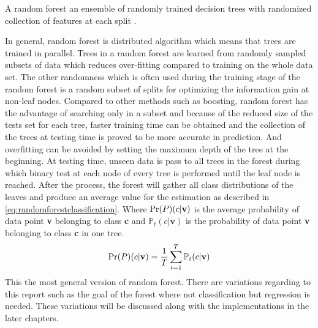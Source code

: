 \begin{definition}
\label{def:Random forest}
	A random forest an ensemble of randomly trained decision trees with randomized collection of features at each split \cite{DFMS}.
\end{definition}
In general, random forest is distributed algorithm which means that trees are trained in parallel. Trees in a random forest are learned from randomly sampled subsets of data which reduces over-fitting compared to training on the whole data set. \cite{GFRF, MVDT,RFML} The other randomness which is often used during the training stage of the random forest is a random subset of splits for optimizing the information gain at non-leaf nodes\cite{GFRF}. Compared to other methods such as boosting, random forest has the advantage of searching only in a subset and because of the reduced size of the tests set for each tree, faster training time can be obtained and the collection of the trees at testing time is proved to be more accurate in prediction.  And overfitting can be avoided by setting the maximum depth of the tree at the beginning. At testing time, unseen data is pass to all trees in the forest during which binary test at each node of every tree is performed until the leaf node is reached. After the process, the forest will gather all class distributions of the leaves and produce an average value for the estimation as described in \eqref{eq:randomforestclassification}. Where $ \Pr(P)(c|\mathbf{v})$ is the average probability of data point \textbf{v} belonging to class \textbf{c} and $\mathbb{P}_{t}(c|\mathbf{v})$ is the probability of data point \textbf{v} belonging to class \textbf{c} in one tree.
\begin{equation}
\label{eq:randomforestclassification}
	\Pr(P)(c|\mathbf{v}) = \frac{1}{T}\sum\limits_{t=1}^T \mathbb{P}_{t}(c|\mathbf{v})
\end{equation}
This the most general version of random forest. There are variations regarding to this report such as the goal of the forest where not classification but regression is needed. These variations will be discussed along with the implementations in the later chapters.

